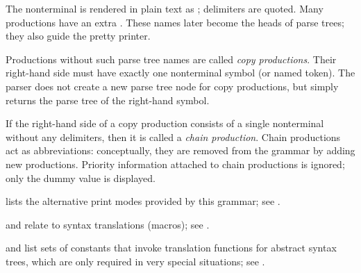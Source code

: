 \begin{isabellebody}
\begin{isamarkuptext}
\begin{description}
\begin{description}
  The nonterminal  is rendered in plain text as ; delimiters are quoted.  Many productions have an extra
  .  These names later become the heads of parse
  trees; they also guide the pretty printer.

  Productions without such parse tree names are called \emph{copy
  productions}.  Their right-hand side must have exactly one
  nonterminal symbol (or named token).  The parser does not create a
  new parse tree node for copy productions, but simply returns the
  parse tree of the right-hand symbol.

  If the right-hand side of a copy production consists of a single
  nonterminal without any delimiters, then it is called a \emph{chain
  production}.  Chain productions act as abbreviations: conceptually,
  they are removed from the grammar by adding new productions.
  Priority information attached to chain productions is ignored; only
  the dummy value  is displayed.

  \item {} lists the alternative print modes
  provided by this grammar; see .

  \item {} and  relate to
  syntax translations (macros); see .

  \item {} and  list sets of constants that invoke
  translation functions for abstract syntax trees, which are only
  required in very special situations; see .


\end{description}
\end{description}
\end{isamarkuptext}
\end{isabellebody}
